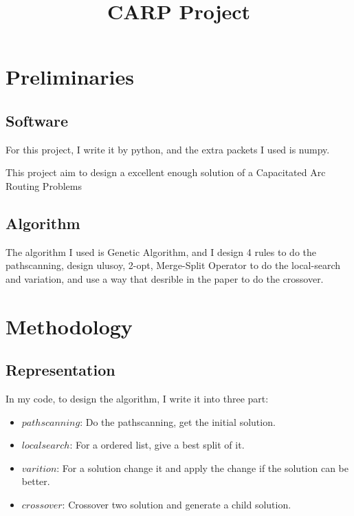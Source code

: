 \documentclass[conference,compsoc]{IEEEtran}
\begin{document}
\title{CARP Project}
\author{
}
\maketitle
\IEEEpeerreviewmaketitle 



\section{Preliminaries}
  \subsection{Software}
  For this project, I write it by python, and the extra packets I used is numpy.

  This project aim to design a excellent enough solution of a Capacitated Arc Routing Problems

  \subsection{Algorithm}
The algorithm I used is Genetic Algorithm, and I design 4 rules to do the pathscanning,  
design ulusoy, 2-opt, Merge-Split Operator to do the local-search and variation, and use a way that desrible in the paper 
\cite{Memetic} to do the crossover.
\section{Methodology}
  \subsection{Representation}
  In my code, to design the algorithm, I write it into three part:
  \begin{itemize}
    \item $pathscanning$: Do the pathscanning, get the initial solution.
    \item $local search$: For a ordered list, give a best split of it.
    \item $varition$: For a solution change it and apply the change if the solution can be better.
    \item $crossover$: Crossover two solution and generate a child solution.
  \end{itemize}
\end{document}
